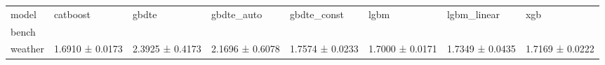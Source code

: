 \begin{tabular}{llllllll}
\toprule
model & catboost & gbdte & gbdte_auto & gbdte_const & lgbm & lgbm_linear & xgb \\
bench &  &  &  &  &  &  &  \\
\midrule
weather & 1.6910 ± 0.0173 & 2.3925 ± 0.4173 & 2.1696 ± 0.6078 & 1.7574 ± 0.0233 & 1.7000 ± 0.0171 & 1.7349 ± 0.0435 & 1.7169 ± 0.0222 \\
\bottomrule
\end{tabular}

